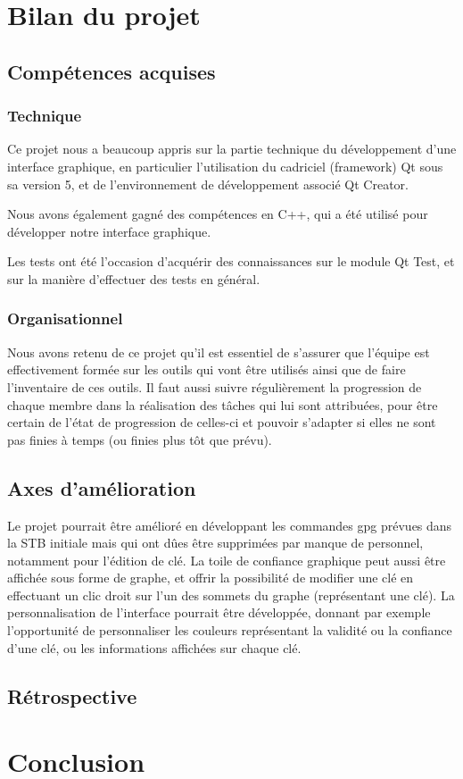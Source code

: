 \documentclass{../res/univ-projet}
\begin{document}
\section{Bilan du projet}
  
  \subsection{Compétences acquises}

    \subsubsection{Technique}
    
      Ce projet nous a beaucoup appris sur la partie technique du développement d'une interface graphique, en particulier l'utilisation du cadriciel (framework) Qt sous sa version 5, et de l'environnement de développement associé Qt Creator.

      Nous avons également gagné des compétences en C++, qui a été utilisé pour développer notre interface graphique.

      Les tests ont été l'occasion d'acquérir des connaissances sur le module Qt Test, et sur la manière d'effectuer des tests en général.



    \subsubsection{Organisationnel}

      Nous avons retenu de ce projet qu'il est essentiel de s'assurer que l'équipe est effectivement formée sur les outils qui vont être utilisés ainsi que de faire l'inventaire de ces outils.
      Il faut aussi suivre régulièrement la progression de chaque membre dans la réalisation des tâches qui lui sont attribuées, pour être certain de l'état de progression de celles-ci et pouvoir s'adapter si elles ne sont pas finies à temps (ou finies plus tôt que prévu).




  \subsection{Axes d'amélioration}
  
    Le projet pourrait être amélioré en développant les commandes gpg prévues dans la STB initiale mais qui ont dûes être supprimées par manque de personnel, notamment pour l'édition de clé. 
    La toile de confiance graphique peut aussi être affichée sous forme de graphe, et offrir la possibilité de modifier une clé en effectuant un clic droit sur l'un des sommets du graphe (représentant une clé).
    La personnalisation de l'interface pourrait être développée, donnant par exemple l'opportunité de personnaliser les couleurs représentant la validité ou la confiance d'une clé, ou les informations affichées sur chaque clé.

  \subsection{Rétrospective}



\section{Conclusion}
\end{document}
